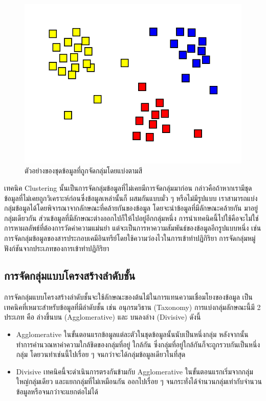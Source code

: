\begin{figure}[htbp]
    \centering
    \includegraphics[width=0.8\linewidth]{fig/cluster.png}
    \caption{ตัวอย่างของชุดข้อมูลที่ถูกจัดกลุ่มโดยแบ่งตามสี}
    \label{fig:cluster}
\end{figure}

เทคนิค Clustering นั้นเป็นการจัดกลุ่มข้อมูลที่ไม่เคยมีการจัดกลุ่มมาก่อน กล่าวคือถ้าหากเรามีชุดข้อมูลที่ไม่เคยถูกวิเคราะห์ก่อนซึ่งข้อมูลเหล่านั้นก็%
ผสมกันแบบมั่ว ๆ หรือไม่มีรูปแบบ เราสามารถแบ่งกลุ่มข้อมูลได้โดยพิจารณาจากลักษณะที่คล้ายกันของข้อมูล โดยจะนำข้อมูลที่มีลักษณะคล้ายกัน%
มาอยู่กลุ่มเดียวกัน ส่วนข้อมูลที่มีลักษณะต่างออกไปก็ให้ไปอยู่อีกกลุ่มหนึ่ง การนำเทคนิคนี้ไปใช้คือจะไม่ใช่การหาผลลัพธ์ที่ต้องการวัดค่าความแม่นยำ 
แต่จะเป็นการหาความสัมพันธ์ของข้อมูลอีกรูปแบบหนึ่ง เช่น การจัดกลุ่มข้อมูลของสารประกอบเคมีอินทรีย์โดยใช้ความว่องไวในการเข้าทำปฏิกิริยา 
การจัดกลุ่มหมู่ฟังก์ชันจากประเภทของการเข้าทำปฏิกิริยา

\subsection{การจัดกลุ่มแบบโครงสร้างลำดับชั้น}
\label{ssec:hierar_clustering}

การจัดกลุ่มแบบโครงสร้างลำดับชั้นจะใช้ลักษณะของต้นไม้ในการแทนความเชื่อมโยงของข้อมูล เป็นเทคนิคที่เหมาะสำหรับข้อมูลที่มีลำดับชั้น เช่น 
อนุกรมวิธาน (Taxonomy) การแบ่งกลุ่มลักษณะนี้มี 2 ประเภท คือ ล่างขึ้นบน (Agglomerative) และ บนลงล่าง (Divisive) ดังนี้ 

\begin{itemize}
    \item Agglomerative ในขั้นตอนแรกข้อมูลแต่ละตัวในชุดข้อมูลนั้นนับเป็นหนึ่งกลุ่ม หลังจากนั้นทำการคำนวณหาค่าความใกล้ชิดของกลุ่มที่อยู่%
    ใกล้กัน ซึ่งกลุ่มที่อยู่ใกล้กันก็จะถูกรวบกันเป็นหนึ่งกลุ่ม โดยวนทำเช่นนี้ไปเรื่อย ๆ จนกว่าจะได้กลุ่มข้อมูลเดียวในที่สุด
    
    \item Divisive เทคนิคนี้จะดำเนินการตรงกันข้ามกับ Agglomerative ในขั้นตอนแรกเริ่มจากกลุ่มใหญ่กลุ่มเดียว และแยกกลุ่มที่ไม่เหมือนกัน%
    ออกไปเรื่อย ๆ จนกระทั่งได้จำนวนกลุ่มเท่ากับจำนวนข้อมูลหรือจนกว่าจะแยกต่อไม่ได้ 
\end{itemize}

